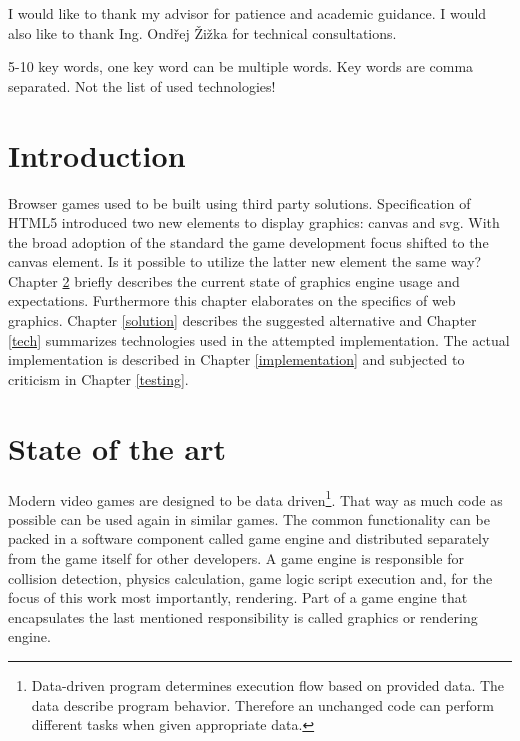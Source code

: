 \documentclass[11pt,oneside, final]{fithesis2}
\begin{document}
  
\FrontMatter  
\ThesisTitlePage  
 
\begin{ThesisDeclaration}  
\DeclarationText  
\AdvisorName  
\end{ThesisDeclaration}  
 
\begin{ThesisThanks}  
I would like to thank my advisor for patience and academic guidance. I would also like to thank Ing. Ondřej Žižka for technical consultations.
\end{ThesisThanks}  
 
\begin{ThesisAbstract}  

\end{ThesisAbstract}  
 
\begin{ThesisKeyWords}  
5-10 key words, one key word can be multiple words. Key words are comma separated. Not the list of used technologies!
\end{ThesisKeyWords}  
 
\MainMatter
 
\tableofcontents          %
 
\chapter{Introduction}
Browser games used to be built using third party solutions\cite{pagella}. Specification of HTML5 introduced two new elements to display graphics: canvas and svg\cite{w3_html5}. With the broad adoption of the standard the game development focus shifted to the canvas element\cite{pagella}. Is it possible to utilize the latter new element the same way? Chapter \ref{theory} briefly describes the current state of graphics engine usage and expectations. Furthermore this chapter elaborates on the specifics of web graphics. Chapter \ref{solution} describes the suggested alternative and Chapter \ref{tech} summarizes technologies used in the attempted implementation. The actual implementation is described in Chapter \ref{implementation} and subjected to criticism in Chapter \ref{testing}.

\chapter{State of the art}
\label{theory}

Modern video games are designed to be data driven\footnote{Data-driven program determines execution flow based on provided data. The data describe program behavior. Therefore an unchanged code can perform different tasks when given appropriate data.\cite{charniak}}. That way as much code as possible can be used again in similar games. The common functionality can be packed in a software component called game engine\cite{gregory} and distributed separately from the game itself for other developers. A game engine is responsible for collision detection, physics calculation, game logic script execution and, for the focus of this work most importantly, rendering. Part of a game engine that encapsulates the last mentioned responsibility is called graphics or rendering engine.
\end{document}
